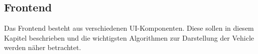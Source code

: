 \begin{newpage}
  
  \subsection{Frontend}
  \label{sub:frontend} 
    Das Frontend besteht aus verschiedenen UI-Komponenten. Diese sollen in diesem Kapitel beschrieben und die wichtigsten Algorithmen zur Darstellung der Vehicle werden näher betrachtet.

  


\end{newpage}